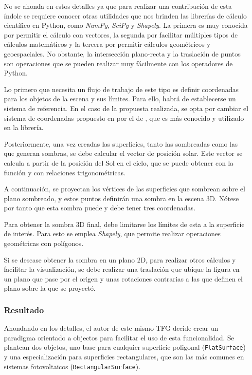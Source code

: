 No se ahonda en estos detalles ya que para realizar una contribución de esta índole se requiere conocer otras utilidades que nos brinden las librerías de cálculo científico en Python, como \textit{NumPy}, \textit{SciPy} y \textit{Shapely}. La primera es muy conocida por permitir el cálculo con vectores, la segunda por facilitar múltiples tipos de cálculos matemáticos y la tercera por permitir cálculos geométricos y geoespaciales. No obstante, la intersección plano-recta y la traslación de puntos son operaciones que se pueden realizar muy fácilmente con los operadores de Python.

Lo primero que necesita un flujo de trabajo de este tipo es definir coordenadas para los objetos de la escena y sus límites. Para ello, habrá de establecerse un sistema de referencia. En el caso de la propuesta realizada, se opta por cambiar el sistema de coordenadas propuesto en \cite{Zainali_Ma_Lu_Stridh_Avelin_Amaducci_Colauzzi_Campana_2023} por el de \cite{Anderson_Mikofski_2020}, que es más conocido y utilizado en la librería.

Posteriormente, una vez creadas las superficies, tanto las sombreadas como las que generan sombras, se debe calcular el vector de posición solar. Este vector se calcula a partir de la posición del Sol en el cielo, que se puede obtener con la función  y con relaciones trigonométricas.

A continuación, se proyectan los vértices de las superficies que sombrean sobre el plano sombreado, y estos puntos definirán una sombra en la escena 3D. Nótese por tanto que esta sombra puede y debe tener tres coordenadas.

Para obtener la sombra 3D final, debe limitarse los límites de esta a la superficie de interés. Para esto se emplea \textit{Shapely}, que permite realizar operaciones geométricas con polígonos.

Si se desease obtener la sombra en un plano 2D, para realizar otros cálculos y facilitar la visualización, se debe realizar una traslación que ubique la figura en un plano que pase por el origen y unas rotaciones contrarias a las que definen el plano sobre la que se proyectó.

\subsubsection{Resultado}

Ahondando en los detalles, el autor de este mismo TFG decide crear un paradigma orientado a objectos para facilitar el uso de esta funcionalidad. Se plantean dos objetos, uno base para cualquier superficie poligonal (\texttt{FlatSurface}) y una especialización para superficies rectangulares, que son las más comunes en sistemas fotovoltaicos (\texttt{RectangularSurface}).

